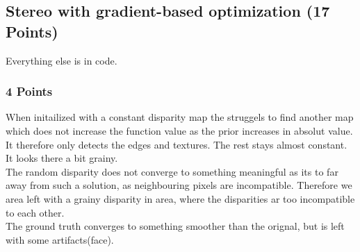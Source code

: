 \newif\ifvimbug
\vimbugfalse

\ifvimbug

\fi


\subsection{Stereo with gradient-based optimization (17 Points)}
Everything else is in code.
\subsubsection{4 Points}
When initailized with a constant disparity map the struggels to find another map which does not increase the function value as the prior increases in absolut value. It therefore only detects the edges and textures. The rest stays almost constant. It looks there a bit grainy.\\
The random disparity does not converge to something meaningful as its to far away from such a solution, as neighbouring pixels are incompatible. Therefore we area left with a grainy  disparity in area, where the disparities ar too incompatible to each other.\\
The ground truth converges to something  smoother than the orignal, but is left with some artifacts(face).\\

